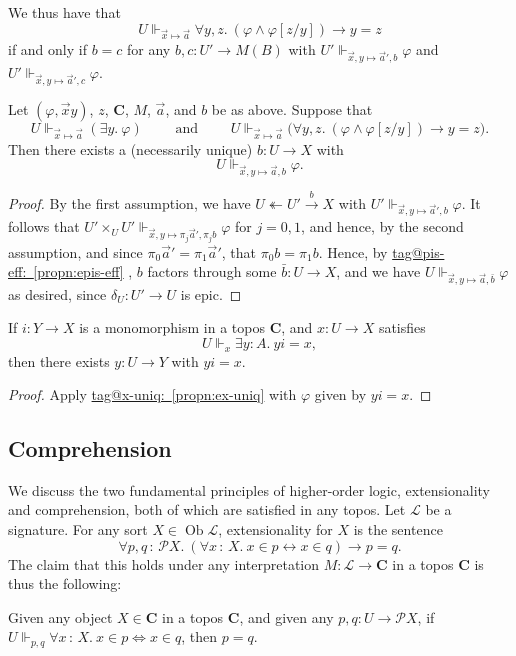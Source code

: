 \documentclass{amsart}
\makeatletter
\newcommand\AND{\text{ and }}
\newcommand\bC{\mathbf{C}}
\newcommand\cL{\mathcal{L}}
\newcommand\Ob{\operatorname{Ob}}
\newcommand\oot{\twoheadleftarrow}
\newcommand\pbig[1]{\big({#1}\big)}
\renewcommand\phi{\varphi}
\newcommand\pow{\mathcal{P}}
\newcommand\tolon{{\,:\,}}
\newcommand\tot{\leftrightarrow}
\newcommand\ToT{\Leftrightarrow}
\newcommand\tox[2][]{\xrightarrow[#1]{#2}}
\newcommand\va{\vek{a}}
\newcommand\vek[1]{{\vec{#1}}}
\newcommand\vx{\vek{x}}
\newcommand\tagword[1]{\csname tag@#1\endcsname}
\def\label@tag#1:#2\@nil{#1}
\newcommand\labeltag[1]{\label@tag#1:\@nil}
\newcommand\jref[1]{%
  \texorpdfstring%
    {\hyperref[#1]{\tagword{\labeltag{#1}}~\ref*{#1}}}%
    {\tagword{\labeltag{#1}}~\ref*{#1}}%
}
\theoremstyle{definition}
\theoremstyle{remark}
\theoremstyle{plainwithref}
\makeatother
\begin{document}
We thus have that
\[
  U \Vdash_{\vx \mapsto \va} \forall y,z.\ (\phi \wedge \phi[z / y]) \to y = z
\]
if and only if \( b = c \) for any \( b,c \colon U' \to M(B) \) with \( U' \Vdash_{\vx,y \mapsto \va',b} \phi \) and \( U' \Vdash_{\vx,y \mapsto \va',c} \phi \).

\begin{propn} \label{propn:ex-uniq}
  Let \( (\phi, \vx y) \), \( z \), \( \bC \), \( M \), \( \va \), and \( b \) be as above.
  Suppose that
  \[
    U \Vdash_{\vx \mapsto \va} (\exists y.\ \phi)
    \qquad\AND\qquad
    U \Vdash_{\vx \mapsto \va} \pbig{\forall y,z.\ (\phi \wedge \phi[z/y]) \to y = z}.
  \]
  Then there exists a (necessarily unique) \( b \colon U \to X \) with
  \[
    U \Vdash_{\vx,y \mapsto \va,b} \phi.
  \]
\end{propn}

\begin{proof}
  By the first assumption, we have \( U \oot U' \tox{b} X \) with \( U' \Vdash_{\vx,y \mapsto \va',b} \phi \).
  It follows that \( U' \times_U U' \Vdash_{\vx,y \mapsto \pi_j \va', \pi_j b} \phi \) for \( j = 0,1 \), and hence, by the second assumption, and since \( \pi_0 \va' = \pi_1 \va' \), that \( \pi_0 b = \pi_1 b \).
  Hence, by \jref{propn:epis-eff}, \( b \) factors through some \( \bar b \colon U \to X \), and we have \( U \Vdash_{\vx, y \mapsto \va, \bar b} \phi \) as desired, since \( \delta_U \colon U' \to U \) is epic.
\end{proof}

\begin{cor} \label{cor:ex-mono-uniq}
  If \( i \colon Y \to X \) is a monomorphism in a topos \( \bC \), and \( x \colon U \to X \) satisfies
  \[
    U \Vdash_x \exists y \colon A.\ y i = x,
  \]
  then there exists \( y \colon U \to Y \) with \( y i = x \).
\end{cor}

\begin{proof}
  Apply \jref{propn:ex-uniq} with \( \phi \) given by \( y i = x \).
\end{proof}

\subsection{Comprehension} \label{subsec:comprehension}
We discuss the two fundamental principles of higher-order logic, extensionality and comprehension, both of which are satisfied in any topos.
Let \( \cL \) be a signature.
For any sort \( X \in \Ob \cL \), extensionality for \( X \) is the sentence
\[
  \forall p, q \tolon \pow X.\ (\forall x \tolon X.\ x \in p \tot x \in q) \to p = q.
\]
The claim that this holds under any interpretation \( M \colon \cL \to \bC \) in a topos \( \bC \) is thus the following:
\begin{propn} \label{propn:topos-extensionality}
  Given any object \( X \in \bC \) in a topos \( \bC \), and given any \( p,q \colon U \to \pow X \), if \( U \Vdash_{p,q} \forall x \tolon X.\ x \in p \ToT x \in q \), then \( p = q \).
\end{propn}
\end{document}
